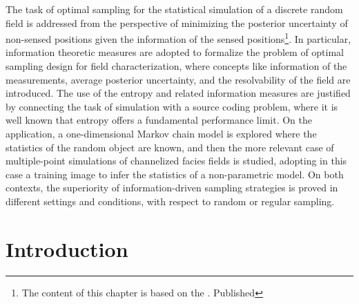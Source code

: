 


The task of optimal %
sampling for the statistical simulation of a discrete random field is addressed from the perspective of minimizing the posterior uncertainty of non-sensed positions given the information of the sensed positions\footnote{The content of this chapter is based on the . Published}. In particular, information theoretic measures are adopted to formalize the problem of optimal %
sampling design
for field characterization,  where concepts like information of the measurements, average posterior uncertainty, and the  resolvability of the field are introduced. The use of the entropy and related information measures are justified by connecting the task of simulation with a source coding problem,  where it is well known that entropy offers a fundamental performance limit.
On the application, a one-dimensional Markov chain model is explored where the statistics of the random object are known, and then the more relevant case of multiple-point simulations of channelized facies fields is studied, adopting in this case a training image to infer the statistics of a non-parametric model.  On both contexts, the superiority of  information-driven %
sampling strategies is proved in different settings and conditions, with respect to random or regular sampling. 



\section{Introduction}
\label{sec_intro_PI}

